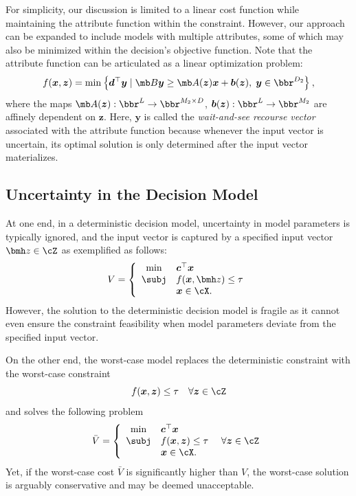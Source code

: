 \documentclass[mnsc, nonblindrev]{informswp}
\newcommand{\1}[1]{\mathds{1}{\left(#1\right)}}
\begin{document}
For simplicity, our discussion is limited to a linear cost function while maintaining the attribute function within the constraint. However, our approach can be expanded to include models with multiple attributes, some of which may also be minimized within the decision's objective function. Note that the attribute function can be articulated as a linear optimization problem:
$$
f(\bm x, \bm z) = \min\left\{ \bm d^\top \bm y \;|\; \mb B \bm y \geq \mb A(\bm z) \bm x + \bm b(\bm z), \; \bm y \in \bbr^{D_2} \right\},
$$
where the maps $\mb A(\bm z):\bbr^{L}\rightarrow \bbr^{M_2\times D}$, $\bm b(\bm z):\bbr^{L}\rightarrow \bbr^{M_2}$ are affinely dependent on $\bm z$. Here, $\bm y$ is called the \textit{wait-and-see recourse vector} associated with the attribute function because whenever the input vector is uncertain, its optimal solution is only determined after the input vector materializes.  

\subsection{Uncertainty in the Decision Model}
\label{sec:uncertainty_metric_RO}

At one end, in a deterministic decision model, uncertainty in model parameters is typically ignored, and the input vector is captured by a specified input vector $\bmh z \in \cZ$ as exemplified as follows:
\begin{equation}
\label{mod:DetermisticModel}
V = \left\{
\begin{array}{cl}
\min & \bm c^\top \bm x \\
\subj & f(\bm x,\bmh z) \leq \tau \\
&\bm x \in \cX.
\end{array}
\right.
\end{equation}
However, the solution to the deterministic decision model is fragile as it cannot even ensure the constraint feasibility when model parameters deviate from the specified input vector. 

On the other end, the worst-case model replaces the deterministic constraint with the worst-case constraint
\[
f(\bm x, \bm z) \leq \tau ~~~\forall \bm z \in \cZ
\]
and solves the following problem 
$$
\bar V = \left\{
\begin{array}{cll}
\min & \bm c^\top \bm x \\
\subj & f(\bm x,\bm z) \leq \tau &~\forall \bm z \in \cZ \\
&\bm x \in \cX.
\end{array}
\right.
$$
Yet, if the worst-case cost $\bar V$ is significantly higher than $V$, the worst-case solution is arguably conservative and may be deemed unacceptable. 
\end{document}

